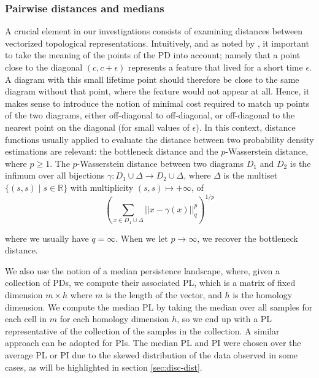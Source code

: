 \documentclass{article}
\begin{document}
\subsubsection{Pairwise distances and medians}

A crucial element in our investigations consists of examining distances between vectorized
topological representations. Intuitively, and as noted by
\citep{berwald2018computing}, it important to take the meaning of the points of the PD into account;
namely that a point close to the diagonal $(c,c+\epsilon)$ represents a feature that lived for a
short time $\epsilon$. A diagram with this small lifetime point should therefore be close to the
same diagram without that point, where the feature would not appear at all. Hence, it makes sense to
introduce the notion of minimal cost required to match up points of the two diagrams, either
off-diagonal to off-diagonal, or off-diagonal to the nearest point on the diagonal (for small values
of $\epsilon$). In this context, distance functions usually applied to evaluate the distance between
two probability density estimations are relevant: the bottleneck distance and the $p$-Wasserstein
distance, where $p\geq 1$. The $p$-Wasserstein distance between two diagrams $D_1$ and $D_2$ is the
infimum over all bijections $\gamma: D_1 \cup \Delta \to D_2 \cup \Delta$, where $\Delta$ is the
multiset $\lbrace (s, s) \mid s \in \mathbb{R} \rbrace$ with multiplicity $(s,s) \mapsto +\infty$,
of
\begin{equation}
  \label{eq:wasserstein_distance}
  \left(\sum_{x \in D_1 \cup \Delta} ||x - \gamma(x)||_q^p \right)^{1/p}
\end{equation}

where we usually have $q=\infty$. When we let $p\to\infty$, we recover the bottleneck distance.

We also use the notion of a median persistence landscape, where, given a collection of PDs, we
compute their associated PL, which is a matrix of fixed dimension $m\times h$ where $m$ is the
length of the vector, and $h$ is the homology dimension. We compute the median PL by taking the
median over all samples for each cell in $m$ for each homology dimension $h$, so we end up with a PL
representative of the collection of the samples in the collection. A similar approach can be adopted
for PIs. The median PL and PI were chosen over the average PL or PI due to the skewed distribution of
the data observed in some cases, as will be highlighted in section \ref{sec:disc-dist}.
\end{document}
